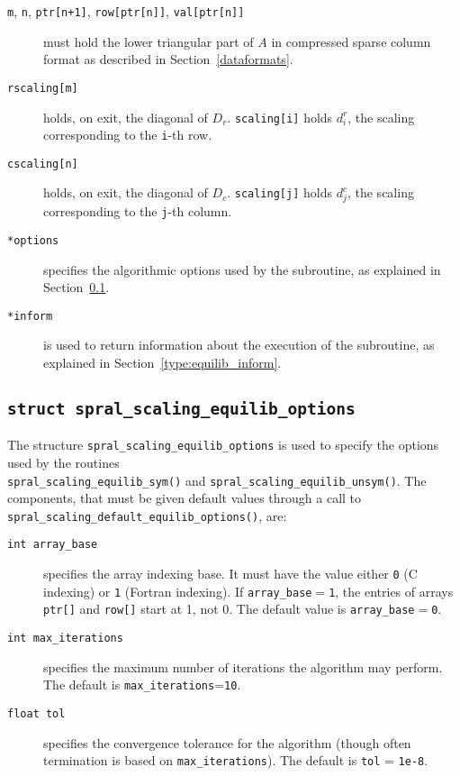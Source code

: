 \begin{description}

\item[\texttt{m}, \texttt{n}, \texttt{ptr[n+1]}, \texttt{row[ptr[n]]}, \texttt{val[ptr[n]]}] must hold the lower triangular part of $A$ in compressed sparse column format as described in Section~\ref{dataformats}.

\item[\texttt{rscaling[m]}] holds, on exit, the diagonal of $D_r$.
\texttt{scaling[i]} holds $d_i^r$, the scaling corresponding to the
\texttt{i}-th row.

\item[\texttt{cscaling[n]}] holds, on exit, the diagonal of $D_c$.
\texttt{scaling[j]} holds $d_j^c$, the scaling corresponding to the
\texttt{j}-th column.

\item[\texttt{*options}] specifies the algorithmic options used by the subroutine, as explained in Section~\ref{type:equilib_options}.

\item[\texttt{*inform}] is used to return information about the execution of the subroutine, as explained in Section~\ref{type:equilib_inform}.


\end{description}

\subsection{\texttt{struct spral\_scaling\_equilib\_options}} \label{type:equilib_options}

The structure \texttt{spral\_scaling\_equilib\_options} is used to specify the options
used by the routines \\\texttt{spral\_scaling\_equilib\_sym()} and \texttt{spral\_scaling\_equilib\_unsym()}. The components, that
must be given default values through a call to \texttt{spral\_scaling\_default\_equilib\_options()}, are:

\begin{description}

\item[\texttt{int array\_base}] specifies the array indexing base. It must
   have the value either \texttt{0} (C indexing) or \texttt{1} (Fortran
   indexing). If \texttt{array\_base}$=$\texttt{1}, the entries of arrays
   \texttt{ptr[]} and \texttt{row[]} start at 1, not 0.
   The default value is \texttt{array\_base}$=$\texttt{0}.

\item[\texttt{int max\_iterations}] specifies the maximum number of iterations the algorithm may perform. The default is \texttt{max\_iterations}=\texttt{10}.

\item[\texttt{float tol}] specifies the convergence tolerance for the algorithm (though often termination is based on \texttt{max\_iterations}). The default is \texttt{tol} = \texttt{1e-8}.

\end{description}

